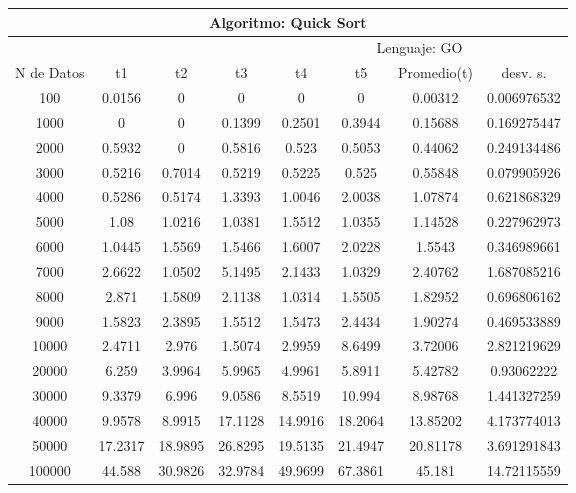 \documentclass{article}
\begin{document}
        \begin{table}[]
        \begin{tabular}{|c|c|c|c|c|c|c|c| }
            \hline
            \multicolumn{8}{|c|}{Algoritmo: Quick Sort} \\ \hline
            \multicolumn{4}{|c|}{} & \multicolumn{4}{c|}{Lenguaje: GO} \\ \hline
              N de Datos &     t1    &  t2         &  t3          &   t4        &    t5     &   Promedio(t)       & desv. s. \\ \hline
                100	&0.0156&0	&0	&0	&0	&0.00312	&0.006976532\\ \hline
                1000	&0	&0	&0.1399	&0.2501	&0.3944	&0.15688	&0.169275447\\ \hline
                2000	&0.5932	&0	&0.5816	&0.523	&0.5053	&0.44062	&0.249134486\\ \hline
                3000	&0.5216	&0.7014	&0.5219	&0.5225	&0.525	&0.55848	&0.079905926\\ \hline
                4000	&0.5286	&0.5174	&1.3393	&1.0046	&2.0038	&1.07874	&0.621868329\\ \hline
                5000	&1.08	&1.0216	&1.0381	&1.5512	&1.0355	&1.14528	&0.227962973\\ \hline
                6000	&1.0445	&1.5569	&1.5466	&1.6007	&2.0228	&1.5543	&0.346989661\\ \hline
                7000	&2.6622	&1.0502	&5.1495	&2.1433	&1.0329	&2.40762	&1.687085216\\ \hline
                8000	&2.871	&1.5809	&2.1138	&1.0314	&1.5505	&1.82952	&0.696806162\\ \hline
                9000	&1.5823	&2.3895	&1.5512	&1.5473	&2.4434	&1.90274	&0.469533889\\ \hline
                10000	&2.4711	&2.976	&1.5074	&2.9959	&8.6499	&3.72006	&2.821219629\\ \hline
                20000	&6.259	&3.9964	&5.9965	&4.9961	&5.8911	&5.42782	&0.93062222\\ \hline
                30000	&9.3379	&6.996	&9.0586	&8.5519	&10.994	&8.98768	&1.441327259\\ \hline
                40000	&9.9578	&8.9915	&17.1128	&14.9916	&18.2064	&13.85202	&4.173774013\\ \hline
                50000	&17.2317	&18.9895	&26.8295	&19.5135	&21.4947	&20.81178	&3.691291843\\ \hline
                100000	&44.588	&30.9826	&32.9784	&49.9699	&67.3861	&45.181	&14.72115559\\ \hline

\end{tabular}
\end{table}
\end{document}
